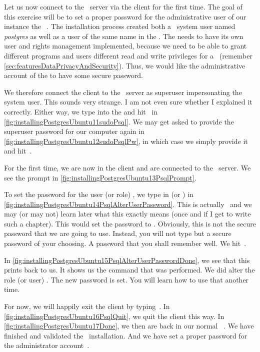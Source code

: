 Let us now connect to the \postgresql\ server via the client for the first time.
The goal of this exercise will be to set a proper password for the administrative user of our instance the \postgresql\ .
The installation process created both a \linux\ system user named \textit{postgres} as well as a user of the same name in the .
The  needs to have its own user and rights management implemented, because we need to be able to grant different programs and users different read and write privileges for a ~(remember \cref{sec:featuresDataPrivacyAndSecurity}).
Thus, we would like the administrative account  of the  to have some secure password.

We therefore connect the  client to the \postgresql\ server as superuser impersonating the  system user.
This sounds very strange.
I am not even sure whether I explained it correctly.
Either way, we type  into the  and hit~\keys{\enter} in \cref{fig:installingPostgresUbuntu11sudoPsql}.
We may get asked to provide the superuser password for our computer again in \cref{fig:installingPostgresUbuntu12sudoPsqlPw}, in which case we simply provide it and hit~\keys{\enter}.

For the first time, we are now in the  client and are connected to the \postgresql\ server.
We see the prompt \expandafter{} in \cref{fig:installingPostgresUbuntu13PsqlPrompt}.%
%
\begin{sloppypar}%
To set the password for the user (or role) , we type in  (or ) in \cref{fig:installingPostgresUbuntu14PsqlAlterUserPassword}.
This is actually \sql\ and we may (or may not) learn later what this exactly means (once and if I get to write such a chapter).
This would set the password to .
Obviously, this is not the secure password that we are going to use.
Instead, you will not type  but a secure password of your choosing.
A password that you shall remember well.
We hit~\keys{\enter}.%
\end{sloppypar}%
%
In \cref{fig:installingPostgresUbuntu15PsqlAlterUserPasswordDone}, we see that this prints  back to us.
It shows us the command that was performed.
We did alter the role (or user) .
The new password is set.
You will learn how to use that another time.

For now, we will happily exit the  client by typing~.
In \cref{fig:installingPostgresUbuntu16PsqlQuit}, we quit the client this way.
In \cref{fig:installingPostgresUbuntu17Done}, we then are back in our normal \bash\ .
We have finished and validated the \postgresql\ installation.
And we have set a proper password for the administrator account~.%
%
\FloatBarrier%
\endhsection%
%
